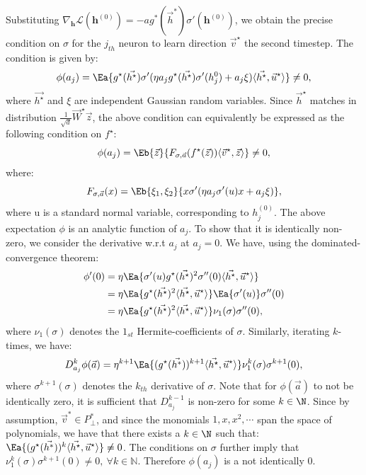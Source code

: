 Substituting $\nabla_{\boldsymbol{h}} \mathcal{L}(\boldsymbol{h}^{(0)}) = -ag^*(\vec{h}^*)\sigma'(\boldsymbol{h}^{(0)})$, we obtain the precise condition on $\sigma$ for the $j_{th}$ neuron to learn direction $\vec{v}^\star$ the second timestep. The condition is given by:
\begin{equation}\label{2402:eq:phi}
   \phi(a_j)= \Ea{g^\star(\vec{h^\star})\sigma'(\eta a_jg^\star(\vec{h^\star})\sigma'(h^0_j)+a_j\xi)\langle\vec{h^\star},\vec{u}^\star\rangle} \neq 0,
\end{equation}
where $\vec{h^\star}$ and $\xi$ are independent Gaussian random variables. 
Since $\vec{h}^\star$ matches in distribution $\frac{1}{\sqrt{d}}\vec{W}^\star \vec{z}$, the above condition can equivalently be expressed as the following condition on $f^\star$:
\begin{equation}\label{2402:eq:phi_def}
       \phi(a_j)= \Eb{\vec{z}}{F_{\sigma, \vec{a}}(f^\star(\vec{z}))\langle \vec{v}^\star, \vec{z}\rangle} \neq 0,
    \end{equation}
where:
\begin{equation}\label{2402:eq:F_def}
    F_{\sigma, \vec{a}}(x) = \Eb{\xi_1,\xi_2}{x \sigma'(\eta a_j\sigma'(u)x  + a_j\xi)}, 
\end{equation}
where u is a standard normal variable, corresponding to $h_j^{(0)}$. The above expectation $\phi$ is an analytic function of $a_j$. To show that it is identically non-zero, we consider the derivative w.r.t $a_j$ at $a_j=0$. We have, using the dominated-convergence theorem: 
\begin{align*}
     \phi'(0) &= \eta \Ea{ \sigma'(u)g^\star(\vec{h^\star})^2\sigma''(0)\langle\vec{h^\star},\vec{u}^\star\rangle}\\
     &= \eta \Ea{ g^\star(\vec{h^\star})^2\langle\vec{h^\star},\vec{u}^\star\rangle}\Ea{\sigma'(u)}\sigma''(0)\\
     & = \eta \Ea{ g^\star(\vec{h^\star})^2\langle\vec{h^\star},\vec{u}^\star\rangle}\nu_{1}(\sigma)\sigma''(0),
\end{align*}
where $\nu_{1}(\sigma)$ denotes the $1_{st}$ Hermite-coefficients of $\sigma$. 
Similarly, iterating $k$-times, we have:
\begin{equation}
    D_{a_j}^{k}\phi(\vec{a}) = \eta^{k+1} \Ea{(g^\star(\vec{h^*}))^{k+1}\langle\vec{h^\star},\vec{u}^\star\rangle} \nu^k_{1}(\sigma)\sigma^{k+1}(0),
\end{equation}
where $\sigma^{k+1}(\sigma)$ denotes the $k_{th}$ derivative of $\sigma$. 
Note that for $\phi(\vec{a})$ to not be identically zero, it is sufficient that $D_{a_j}^{k-1}$ is non-zero for some $k \in \N$.
Since by assumption, $\vec{v}^* \in P^*_\perp$, and since the monomials $1,x,x^2,\cdots$ span the space of polynomials, we have that there exists a $k \in \N$ such that:
$\Ea{(g^\star(\vec{h^*}))^{k}\langle\vec{h^\star},\vec{u}^\star\rangle} \neq 0$. The conditions on $\sigma$ further imply that $\nu^k_{1}(\sigma)\sigma^{k+1}(0) \neq 0, \  \forall k \in \mathbb{N}$. Therefore $\phi(a_j)$ is a not identically $0$.

